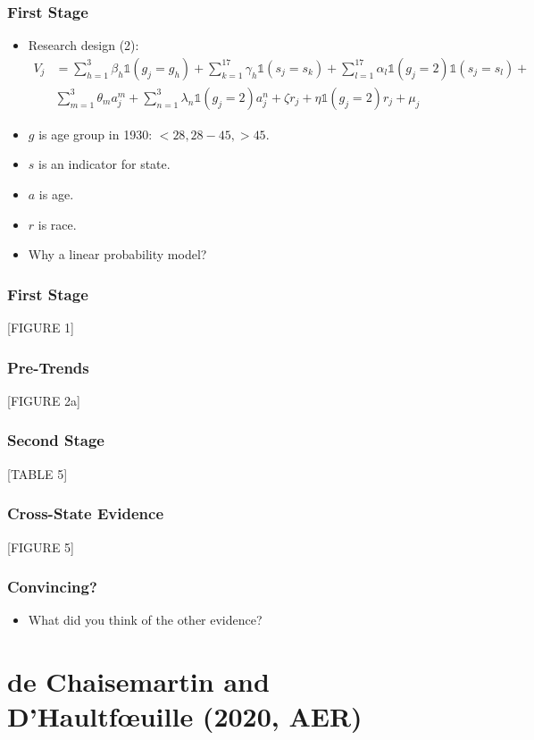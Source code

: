 \documentclass[english,xcolor=svgnames]{beamer}
\begin{document}
\begin{frame}
	\frametitle[alignment=center]{First Stage}
	\begin{itemize}
		\item Research design (2):
		\begin{align*}
			V_j &= \sum_{h=1}^{3}\beta_h \mathbb{1}(g_j = g_h) + \sum_{k=1}^{17}\gamma_h \mathbb{1}(s_j = s_k) + \sum_{l=1}^{17}\alpha_l \mathbb{1}(g_j = 2)\mathbb{1}(s_j = s_l) + \\
			&\sum_{m=1}^{3}\theta_m a_j^m + \sum_{n=1}^{3}\lambda_n \mathbb{1}(g_j = 2)a_j^n + \zeta r_j + \eta \mathbb{1}(g_j = 2) r_j  + \mu_j
		\end{align*}
		\item $g$ is age group in 1930: $<28, 28-45, >45$.
		\item $s$ is an indicator for state.
		\item $a$ is age.
		\item $r$ is race.
		\item Why a linear probability model?
	\end{itemize}
\end{frame}

\begin{frame}
	\frametitle[alignment=center]{First Stage}
	[FIGURE 1]
\end{frame}

\begin{frame}
	\frametitle[alignment=center]{Pre-Trends}
	[FIGURE 2a]
\end{frame}

\begin{frame}
	\frametitle[alignment=center]{Second Stage}
	[TABLE 5]
\end{frame}

\begin{frame}
	\frametitle[alignment=center]{Cross-State Evidence}
	[FIGURE 5]
\end{frame}

\begin{frame}
	\frametitle[alignment=center]{Convincing?}
	\begin{itemize}
		\item What did you think of the other evidence?
	\end{itemize}
\end{frame}


\section{de Chaisemartin and D'Haultf{\oe}uille (2020, AER)}
\end{document}
